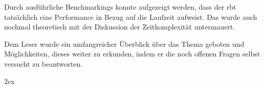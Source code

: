 \documentclass[11pt]{article}
\begin{document}
Durch ausführliche Benchmarkings konnte aufgezeigt werden, dass der \gls{rbt} tatsächlich eine Performance in Bezug auf die Laufzeit aufweist.
Das wurde auch nochmal theoretisch mit der Diskussion der Zeitkomplexität untermauert. 

Dem Leser wurde ein umfangreicher Überblick über das Thema geboten und Möglichkeiten, dieses weiter zu erkunden, 
indem er die noch offenen Fragen selbst versucht zu beantworten. 

\pagebreak
\begingroup
\parindent 0pt
\parskip 2ex
\def\enotesize{\normalsize}
\theendnotes
\endgroup

\pagebreak

\end{document}
